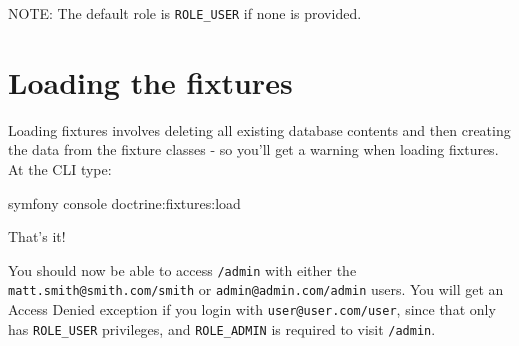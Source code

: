 \documentclass[a4paperpaper,openright]{book}
\newenvironment{Shaded}{}{}
\newcommand{\CommentTok}[1]{\textcolor[rgb]{0.38,0.63,0.69}{\textit{#1}}}
\newcommand{\ExtensionTok}[1]{#1}
\newcommand{\KeywordTok}[1]{\textcolor[rgb]{0.00,0.44,0.13}{\textbf{#1}}}
\newcommand{\NormalTok}[1]{#1}
\newcommand{\OtherTok}[1]{\textcolor[rgb]{0.00,0.44,0.13}{#1}}
\newcommand{\StringTok}[1]{\textcolor[rgb]{0.25,0.44,0.63}{#1}}
\begin{document}
\begin{Shaded}
\end{Shaded}

NOTE: The default role is \texttt{ROLE\_USER} if none is provided.

\hypertarget{loading-the-fixtures-1}{%
\section{Loading the fixtures}\label{loading-the-fixtures-1}}

Loading fixtures involves deleting all existing database contents and
then creating the data from the fixture classes - so you'll get a
warning when loading fixtures. At the CLI type:

\begin{Shaded}
\begin{Highlighting}[]
    \ExtensionTok{symfony}\NormalTok{ console doctrine:fixtures:load}
\end{Highlighting}
\end{Shaded}

That's it!

You should now be able to access \texttt{/admin} with either the
\texttt{matt.smith@smith.com/smith} or \texttt{admin@admin.com/admin}
users. You will get an Access Denied exception if you login with
\texttt{user@user.com/user}, since that only has \texttt{ROLE\_USER}
privileges, and \texttt{ROLE\_ADMIN} is required to visit
\texttt{/admin}.
\end{document}
